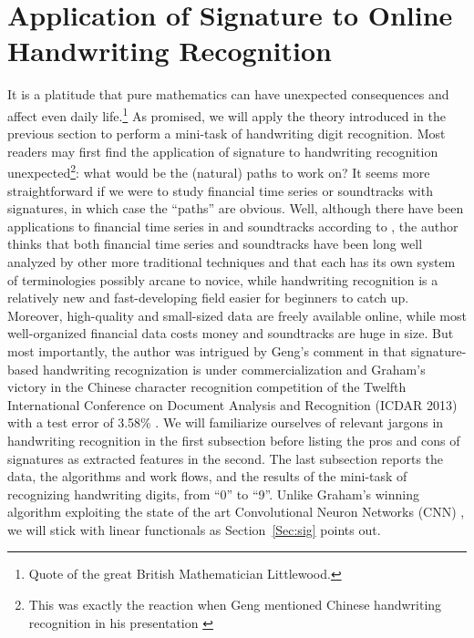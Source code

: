 \documentclass[fleqn]{article}
\theoremstyle{definition}
\theoremstyle{remark}
\begin{document}
\section{Application of Signature to Online Handwriting Recognition} \label{Sec:recog}
It is a platitude that pure mathematics can have unexpected consequences and affect even daily life.\footnote{Quote of the great British Mathematician Littlewood.} As promised, we will apply the theory introduced in the previous section to perform a mini-task of handwriting digit recognition. Most readers may first find the application of signature to handwriting recognition unexpected\footnote{This was exactly the reaction when Geng mentioned Chinese handwriting recognition in his presentation \cite{Geng2016CCF}}: what would be the (natural) paths to work on? It seems more straightforward if we were to study financial time series or soundtracks with signatures, in which case the ``paths'' are obvious. Well, although there have been applications to financial time series in \citet{SigFin,lyons2014HFT} and soundtracks according to \citet{Graham2013}, the author thinks that both financial time series and soundtracks have been long well analyzed by other more traditional techniques and that each has its own system of terminologies possibly arcane to novice, while handwriting recognition is a relatively new and fast-developing field easier for beginners to catch up. Moreover, high-quality and small-sized data are freely available online, while most well-organized financial data costs money and soundtracks are huge in size. But most importantly, the author was intrigued by Geng's comment in \cite{Geng2016CCF} that signature-based handwriting recognization is under commercialization and Graham's victory in the Chinese character recognition competition of the Twelfth International Conference on Document Analysis and Recognition (ICDAR 2013) with a test error of 3.58\% \cite{Graham2013}. We will familiarize ourselves of relevant jargons in handwriting recognition in the first subsection before listing the pros and cons of signatures as extracted features in the second. The last subsection reports the data, the algorithms and work flows, and the results of the mini-task of recognizing handwriting digits, from ``0'' to ``9''. Unlike Graham's winning algorithm exploiting the state of the art Convolutional Neuron Networks (CNN) \cite{Graham2013}, we will stick with linear functionals as Section~\ref{Sec:sig} points out.
\end{document}
